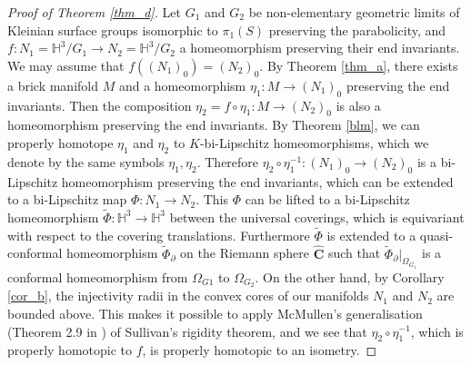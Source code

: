 \documentclass{amsart}
\theoremstyle{definition}
\numberwithin{figure}{section}
\numberwithin{equation}{section}
\newcommand{\blackboard}[1]{\ensuremath{\mathbb{#1}}}
\newcommand{\hyperbolic}{\blackboard{H}}
\def\hh{\hyperbolic}
\def\part{\partial}
\def\wh{\widehat}
\def\wt{\widetilde}
\def\L{\Lambda}
\def\L{\Lambda}
\begin{document}
\begin{proof}[Proof of Theorem \ref{thm_d}]
Let $G_1$ and $G_2$ be non-elementary geometric limits of Kleinian surface groups isomorphic to $\pi_1(S)$ preserving the parabolicity, and $f:N_1=\hyperbolic^3/G_1\rightarrow N_2=\hyperbolic^3/G_2$ a homeomorphism preserving their end invariants.
We may assume that $f((N_1)_0)=(N_2)_0$.
By Theorem \ref{thm_a}, there exists a brick manifold $M$ and a homeomorphism $\eta_1:M \rightarrow (N_1)_0$ preserving  the end invariants.
Then the composition $\eta_2=f\circ \eta_1:M\rightarrow (N_2)_0$ is also a homeomorphism preserving the end invariants.
By Theorem \ref{blm},  we can properly homotope $\eta_1$ and $\eta_2$ to $K$-bi-Lipschitz homeomorphisms, which we denote by the same symbols $\eta_1, \eta_2$.
Therefore  $\eta_2\circ \eta_1^{-1}:(N_1)_0 \rightarrow (N_2)_0$ is a bi-Lipschitz homeomorphism preserving the  end invariants, 
which can be extended to a bi-Lipschitz map $\Phi:N_1\rightarrow N_2$.
This $\Phi$ can be lifted to a bi-Lipschitz homeomorphism $\widetilde \Phi:\hh^3\rightarrow \hh^3$  between the universal coverings, 
which is equivariant with respect to the covering translations.
Furthermore $\widetilde \Phi$ is extended to a quasi-conformal homeomorphism $\wt \Phi_{\part}$ 
on the Riemann sphere $\wh{\mathbf{C}}$ such that $\wt\Phi_{\part}|_{\Omega_{G_1}}$ is a conformal homeomorphism 
from $\Omega_{G1}$ to $\Omega_{G_2}$.
On the other hand, by Corollary \ref{cor_b}, the injectivity radii in the convex cores of our manifolds $N_1$ and $N_2$ are bounded above.
This makes it possible to apply McMullen's generalisation (Theorem 2.9 in \cite{Mc}) of Sullivan's rigidity theorem, and we see that $\eta_2 \circ \eta_1^{-1}$, which is properly homotopic to $f$, is properly homotopic to an isometry.
\end{proof}
\end{document}
